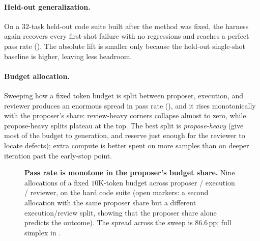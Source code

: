 \paragraph{Held-out generalization.} On a $32$-task held-out code suite built after the method was fixed, the harness again recovers every first-shot failure with no regressions and reaches a perfect pass rate (). The absolute lift is smaller only because the held-out single-shot baseline is higher, leaving less headroom.

\paragraph{Budget allocation.} Sweeping how a fixed token budget is split between proposer, execution, and reviewer produces an enormous spread in pass rate (), and it rises monotonically with the proposer's share: review-heavy corners collapse almost to zero, while propose-heavy splits plateau at the top. The best split is \emph{propose-heavy} (give most of the budget to generation, and reserve just enough for the reviewer to locate defects); extra compute is better spent on more samples than on deeper iteration past the early-stop point.

\begin{figure}[t]
\centering
{}
\caption{\textbf{Pass rate is monotone in the proposer's budget share.} Nine allocations of a fixed $10$K-token budget across proposer / execution / reviewer, on the hard code suite (open markers: a second allocation with the same proposer share but a different execution/review split, showing that the proposer share alone predicts the outcome). The spread across the sweep is $86.6$\,pp; full simplex in .}
\label{fig:allocation}
\end{figure}
